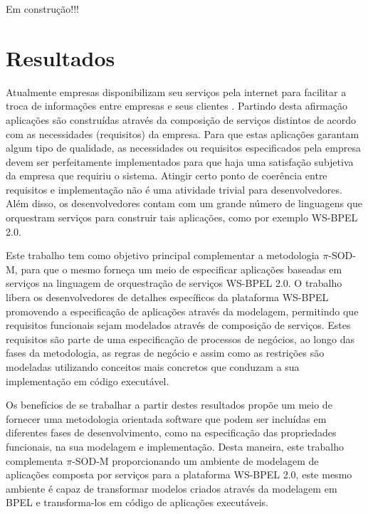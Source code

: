Em construção!!!

\section{Resultados}%
%


Atualmente empresas disponibilizam seu serviços pela internet para facilitar a troca de informações entre empresas e seus clientes . Partindo desta afirmação aplicações são construídas através da composição de serviços distintos de acordo com as necessidades (requisitos) da empresa. Para que estas aplicações garantam algum tipo de qualidade, as   necessidades ou requisitos especificados pela empresa devem ser perfeitamente implementados para que haja uma satisfação subjetiva da empresa que requiriu o sistema. Atingir certo ponto de coerência entre requisitos e implementação não é uma atividade trivial para desenvolvedores. Além disso, os desenvolvedores contam com um grande número de linguagens que orquestram serviços para construir tais aplicações, como por exemplo WS-BPEL 2.0.

Este trabalho tem como objetivo principal complementar a metodologia $\pi$-SOD-M, para que
o mesmo forneça um meio de especificar aplicações baseadas em serviços na linguagem de orquestração de serviços WS-BPEL 2.0. O trabalho libera os desenvolvedores de detalhes específicos da plataforma WS-BPEL promovendo a especificação de aplicações através da modelagem, permitindo que requisitos funcionais sejam modelados através de composição de serviços. Estes requisitos são parte de uma especificação de processos de negócios, ao longo das fases da metodologia, as regras de negócio e assim como as restrições são modeladas utilizando conceitos mais concretos que conduzam a sua implementação em código executável.

Os benefícios de se trabalhar a partir destes resultados propõe um meio de fornecer uma metodologia orientada software que podem ser incluídas em diferentes fases de desenvolvimento, como na especificação das propriedades funcionais, na sua modelagem e implementação. Desta maneira, este trabalho complementa $\pi$-SOD-M proporcionando um ambiente de modelagem de aplicações composta por serviços para a plataforma WS-BPEL 2.0, este mesmo ambiente é capaz de
transformar modelos criados através da modelagem em BPEL e transforma-los em código de
aplicações executáveis.




